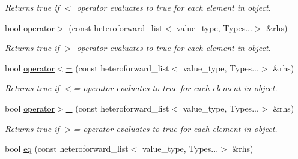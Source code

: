 \begin{DoxyCompactItemize}
\begin{DoxyCompactList}\small\item\em Returns true if $<$ operator evaluates to true for each element in object. \end{DoxyCompactList}\item 
\hypertarget{classheterogeneous_1_1heteroforward__list_3_01_t_00_01_types_8_8_8_4_a53105623b3fa15a69a755abb72d8d9e8}{}bool \hyperlink{classheterogeneous_1_1heteroforward__list_3_01_t_00_01_types_8_8_8_4_a53105623b3fa15a69a755abb72d8d9e8}{operator$>$} (const heteroforward\+\_\+list$<$ value\+\_\+type, Types...$>$ \&rhs)\label{classheterogeneous_1_1heteroforward__list_3_01_t_00_01_types_8_8_8_4_a53105623b3fa15a69a755abb72d8d9e8}

\begin{DoxyCompactList}\small\item\em Returns true if $>$ operator evaluates to true for each element in object. \end{DoxyCompactList}\item 
\hypertarget{classheterogeneous_1_1heteroforward__list_3_01_t_00_01_types_8_8_8_4_aa99793464483ba0227a60a24757cb3e4}{}bool \hyperlink{classheterogeneous_1_1heteroforward__list_3_01_t_00_01_types_8_8_8_4_aa99793464483ba0227a60a24757cb3e4}{operator$<$=} (const heteroforward\+\_\+list$<$ value\+\_\+type, Types...$>$ \&rhs)\label{classheterogeneous_1_1heteroforward__list_3_01_t_00_01_types_8_8_8_4_aa99793464483ba0227a60a24757cb3e4}

\begin{DoxyCompactList}\small\item\em Returns true if $<$= operator evaluates to true for each element in object. \end{DoxyCompactList}\item 
\hypertarget{classheterogeneous_1_1heteroforward__list_3_01_t_00_01_types_8_8_8_4_aa4b61fd5871e58c3c19d9b6f32906d59}{}bool \hyperlink{classheterogeneous_1_1heteroforward__list_3_01_t_00_01_types_8_8_8_4_aa4b61fd5871e58c3c19d9b6f32906d59}{operator$>$=} (const heteroforward\+\_\+list$<$ value\+\_\+type, Types...$>$ \&rhs)\label{classheterogeneous_1_1heteroforward__list_3_01_t_00_01_types_8_8_8_4_aa4b61fd5871e58c3c19d9b6f32906d59}

\begin{DoxyCompactList}\small\item\em Returns true if $>$= operator evaluates to true for each element in object. \end{DoxyCompactList}\item 
\hypertarget{classheterogeneous_1_1heteroforward__list_3_01_t_00_01_types_8_8_8_4_adaf193aa7916e9ba2da8216fe9a5ed7f}{}bool \hyperlink{classheterogeneous_1_1heteroforward__list_3_01_t_00_01_types_8_8_8_4_adaf193aa7916e9ba2da8216fe9a5ed7f}{eq} (const heteroforward\+\_\+list$<$ value\+\_\+type, Types...$>$ \&rhs)\label{classheterogeneous_1_1heteroforward__list_3_01_t_00_01_types_8_8_8_4_adaf193aa7916e9ba2da8216fe9a5ed7f}


\end{DoxyCompactItemize}
